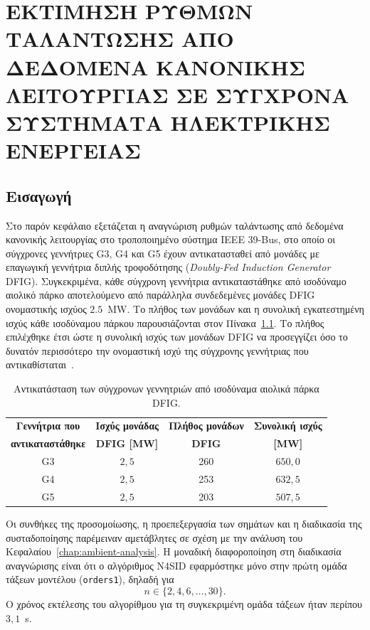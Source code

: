 \chapter{ΕΚΤΙΜΗΣΗ ΡΥΘΜΩΝ ΤΑΛΑΝΤΩΣΗΣ ΑΠΟ ΔΕΔΟΜΕΝΑ ΚΑΝΟΝΙΚΗΣ ΛΕΙΤΟΥΡΓΙΑΣ ΣΕ ΣΥΓΧΡΟΝΑ ΣΥΣΤΗΜΑΤΑ ΗΛΕΚΤΡΙΚΗΣ ΕΝΕΡΓΕΙΑΣ}
\section{Εισαγωγή}
Στο παρόν κεφάλαιο εξετάζεται η αναγνώριση ρυθμών ταλάντωσης από δεδομένα κανονικής λειτουργίας στο τροποποιημένο σύστημα IEEE 39-Bus, στο οποίο οι σύγχρονες γεννήτριες G3, G4 και G5 έχουν αντικατασταθεί από μονάδες με επαγωγική γεννήτρια διπλής τροφοδότησης (\textenglish{\textit{Doubly-Fed Induction Generator}} \textendash{} DFIG). Συγκεκριμένα, κάθε σύγχρονη γεννήτρια αντικαταστάθηκε από ισοδύναμο αιολικό πάρκο αποτελούμενο από παράλληλα συνδεδεμένες μονάδες DFIG ονομαστικής ισχύος $2.5$~MW. Το πλήθος των μονάδων και η συνολική εγκατεστημένη ισχύς κάθε ισοδύναμου πάρκου παρουσιάζονται στον Πίνακα~\ref{tab:ambdfig:dfig_count}. Το πλήθος επιλέχθηκε έτσι ώστε η συνολική ισχύς των μονάδων DFIG να προσεγγίζει όσο το δυνατόν περισσότερο την ονομαστική ισχύ της σύγχρονης γεννήτριας που αντικαθίσταται~\cite{alzahrani2020dynamic}.

\begin{table}[htbp]
    \centering
    \caption{Αντικατάσταση των σύγχρονων γεννητριών από ισοδύναμα αιολικά πάρκα DFIG.}
    \label{tab:ambdfig:dfig_count}
    \begin{tabular}{cccc}
        \toprule
        \textbf{Γεννήτρια που} & \textbf{Ισχύς μονάδας} & \textbf{Πλήθος μονάδων} & \textbf{Συνολική ισχύς} \\
        \textbf{αντικαταστάθηκε} & \textbf{DFIG [MW]} & \textbf{DFIG} & \textbf{[MW]} \\
        \midrule
        G3 & $2{,}5$ & 260 & $650{,}0$ \\
        G4 & $2{,}5$ & 253 & $632{,}5$ \\
        G5 & $2{,}5$ & 203 & $507{,}5$ \\
        \bottomrule
    \end{tabular}
\end{table}

Οι συνθήκες της προσομοίωσης, η προεπεξεργασία των σημάτων και η διαδικασία της συσταδοποίησης παρέμειναν αμετάβλητες σε σχέση με την ανάλυση του Κεφαλαίου~\ref{chap:ambient-analysis}. Η μοναδική διαφοροποίηση στη διαδικασία αναγνώρισης είναι ότι ο αλγόριθμος N4SID εφαρμόστηκε μόνο στην πρώτη ομάδα τάξεων μοντέλου (\texttt{orders1}), δηλαδή για
\[
n\in\{2,4,6,\ldots,30\}.
\]
Ο χρόνος εκτέλεσης του αλγορίθμου για τη συγκεκριμένη ομάδα τάξεων ήταν περίπου $3{,}1$~s.
